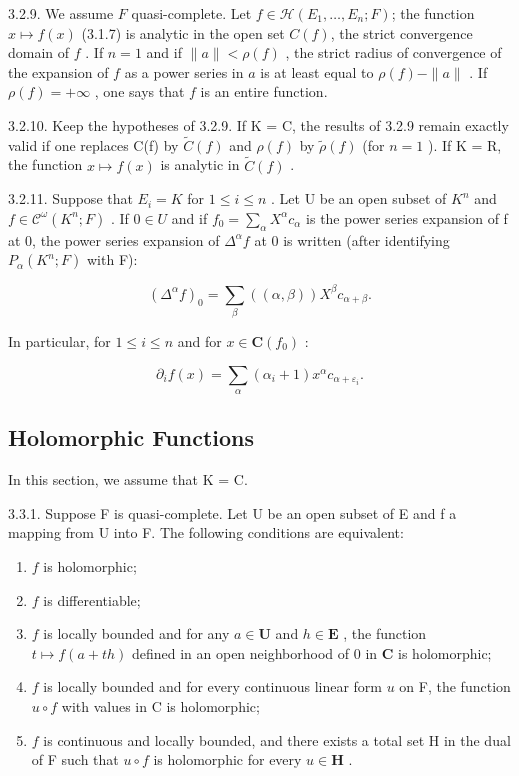 3.2.9. We assume \(F\) quasi-complete. Let \(f \in \mathcal{H}(E_1, \ldots, E_n; F)\); the function \(x \mapsto f(x)\) (3.1.7) is analytic in the open set \(C(f)\), the strict convergence domain of \(f\) . If \(n = 1\) and if \(\|a\| < \rho(f)\) , the strict radius of convergence of the expansion of \(f\) as a power series in \(a\) is at least equal to \(\rho(f) - \|a\|\) . If \(\rho(f) = +\infty\) , one says that \(f\) is an entire function.

3.2.10. Keep the hypotheses of 3.2.9. If K = C, the results of 3.2.9 remain exactly valid if one replaces C(f) by \(\tilde{C}(f)\) and \(\rho(f)\) by \(\tilde{\rho}(f)\) (for \(n = 1\) ). If K = R, the function \(x \mapsto f(x)\) is analytic in \(\tilde{C}(f)\) .

3.2.11. Suppose that \(E_{i} = K\) for \(1 \leqslant i \leqslant n\) . Let U be an open subset of \(K^{n}\) and \(f \in \mathcal{C}^{\omega}(K^{n}; F)\) . If \(0 \in U\) and if \(f_{0} = \sum_{\alpha} X^{\alpha} c_{\alpha}\) is the power series expansion of f at 0, the power series expansion of \(\Delta^{\alpha} f\) at 0 is written (after identifying \(P_{\alpha}(K^{n}; F)\) with F):

\[
(\Delta^ {\alpha} f) _ {0} = \sum_ {\beta} ((\alpha , \beta)) X ^ {\beta} c _ {\alpha + \beta}.
\]

In particular, for \(1 \leqslant i \leqslant n\) and for \(x \in \mathbf{C}(f_0)\) :

\[
\partial_ {i} f (x) = \sum_ {\alpha} (\alpha_ {i} + 1) x ^ {\alpha} c _ {\alpha + \varepsilon_ {i}}.
\]

\subsection{Holomorphic Functions}

In this section, we assume that K = C.

3.3.1. Suppose F is quasi-complete. Let U be an open subset of E and f a mapping from U into F. The following conditions are equivalent:

\begin{enumerate}
\def\labelenumi{(\roman{enumi})}
\item
  \(f\) is holomorphic;
\item
  \(f\) is differentiable;
\item
  \(f\) is locally bounded and for any \(a \in \mathbf{U}\) and \(h \in \mathbf{E}\) , the function \(t \mapsto f(a + th)\) defined in an open neighborhood of 0 in \(\mathbf{C}\) is holomorphic;
\item
  \(f\) is locally bounded and for every continuous linear form \(u\) on F, the function \(u \circ f\) with values in C is holomorphic;
\item
  \(f\) is continuous and locally bounded, and there exists a total set H in the dual of F such that \(u \circ f\) is holomorphic for every \(u \in \mathbf{H}\) .
\end{enumerate}

